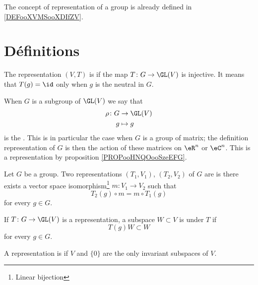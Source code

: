 The concept of representation of a group is already defined in \ref{DEFooXVMSooXDIfZV}.

\section{Définitions}

\begin{definition}      \label{DEFooAFSAooGDSDBb}
    The representation \( (V,T)\) is  if the map \( T\colon G\to \GL(V)\) is injective. It means that \( T(g)=\id\) only when \( g\) is the neutral in \( G\).
\end{definition}

When \( G\) is a subgroup of \( \GL(V)\) we say that
\begin{equation}
    \begin{aligned}
        \rho\colon G&\to \GL(V) \\
        g&\mapsto g 
    \end{aligned}
\end{equation}
is the . This is in particular the case when \( G\) is a group of matrix; the definition representation of \( G\) is then the action of these matrices on \( \eR^n\) or \( \eC^n\). This is a representation by proposition \ref{PROPooHNQOooSzeEFG}.

\begin{definition}
    Let \( G\) be a group. Two representations \( (T_1,V_1)\), \( (T_2,V_2)\) of \( G\) are  is there exists a vector space isomorphism\footnote{Linear bijection} \( m\colon V_1\to V_2\) such that
    \begin{equation}
        T_2(g)\circ m=m\circ T_1(g)
    \end{equation}
    for every \( g\in G\).
\end{definition}

\begin{definition}
    If \( T\colon G\to \GL(V)\) is a representation, a subspace \( W\subset V\) is  under \( T\) if
    \begin{equation}
        T(g)W\subset W
    \end{equation}
    for every \( g\in G\).

    A representation is  if \( V\) and \( \{ 0 \}\) are the only invariant subspaces of \( V\).
\end{definition}

